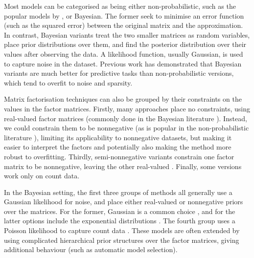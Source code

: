 \documentclass[letterpaper]{article} %
\begin{document}
	Most models can be categorised as being either non-probabilistic, such as the popular models by \cite{Lee2000}, or Bayesian. The former seek to minimise an error function (such as the squared error) between the original matrix and the approximation. In contrast, Bayesian variants treat the two smaller matrices as random variables, place prior distributions over them, and find the posterior distribution over their values after observing the data. A likelihood function, usually Gaussian, is used to capture noise in the dataset. Previous work \cite{Brouwer2017a} has demonstrated that Bayesian variants are much better for predictive tasks than non-probabilistic versions, which tend to overfit to noise and sparsity. 
	
	Matrix factorisation techniques can also be grouped by their constraints on the values in the factor matrices. Firstly, many approaches place no constraints, using real-valued factor matrices (commonly done in the Bayesian literature \cite{Salakhutdinov2008,Gonen2012}). Instead, we could constrain them to be nonnegative (as is popular in the non-probabilistic literature \cite{Lee2000,Tan2013}), limiting its applicability to nonnegative datasets, but making it easier to interpret the factors and potentially also making the method more robust to overfitting. Thirdly, semi-nonnegative variants constrain one factor matrix to be nonnegative, leaving the other real-valued \cite{FeiWangTaoLi2008,Ding2010}. Finally, some versions work only on count data.
	
	In the Bayesian setting, the first three groups of methods all generally use a Gaussian likelihood for noise, and place either real-valued or nonnegative priors over the matrices. For the former, Gaussian is a common choice \cite{Salakhutdinov2008,Gonen2012,Virtanen2011,Virtanen2012}, and for the latter options include the exponential distributions \cite{Schmidt2009}. The fourth group uses a Poisson likelihood to capture count data \cite{Gopalan2014,Gopalan2015,Hu2015}. These models are often extended by using complicated hierarchical prior structures over the factor matrices, giving additional behaviour (such as automatic model selection).
	
\end{document}
